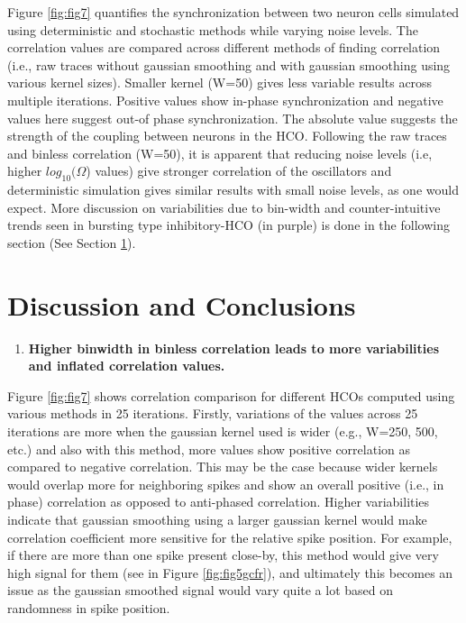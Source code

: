 \documentclass[
]{article}
\providecommand{\tightlist}{%
  \setlength{\itemsep}{0pt}\setlength{\parskip}{0pt}}
\begin{document}
Figure \ref{fig:fig7} quantifies the synchronization between two neuron cells simulated using deterministic and stochastic methods while varying noise levels. The correlation values are compared across different methods of finding correlation (i.e., raw traces without gaussian smoothing and with gaussian smoothing using various kernel sizes). Smaller kernel (W=50) gives less variable results across multiple iterations. Positive values show in-phase synchronization and negative values here suggest out-of phase synchronization. The absolute value suggests the strength of the coupling between neurons in the HCO. Following the raw traces and binless correlation (W=50), it is apparent that reducing noise levels (i.e, higher \(log_{10}(\Omega\)) values) give stronger correlation of the oscillators and deterministic simulation gives similar results with small noise levels, as one would expect. More discussion on variabilities due to bin-width and counter-intuitive trends seen in bursting type inhibitory-HCO (in purple) is done in the following section (See Section \ref{CD}).

\hypertarget{CD}{%
\section{Discussion and Conclusions}\label{CD}}

\begin{enumerate}
\def\labelenumi{\arabic{enumi}.}
\tightlist
\item
  \textbf{Higher binwidth in binless correlation leads to more variabilities and inflated correlation values.}
\end{enumerate}

Figure \ref{fig:fig7} shows correlation comparison for different HCOs computed using various methods in 25 iterations. Firstly, variations of the values across 25 iterations are more when the gaussian kernel used is wider (e.g., W=250, 500, etc.) and also with this method, more values show positive correlation as compared to negative correlation. This may be the case because wider kernels would overlap more for neighboring spikes and show an overall positive (i.e., in phase) correlation as opposed to anti-phased correlation. Higher variabilities indicate that gaussian smoothing using a larger gaussian kernel would make correlation coefficient more sensitive for the relative spike position. For example, if there are more than one spike present close-by, this method would give very high signal for them (see in Figure \ref{fig:fig5gcfr}), and ultimately this becomes an issue as the gaussian smoothed signal would vary quite a lot based on randomness in spike position.
\end{document}
